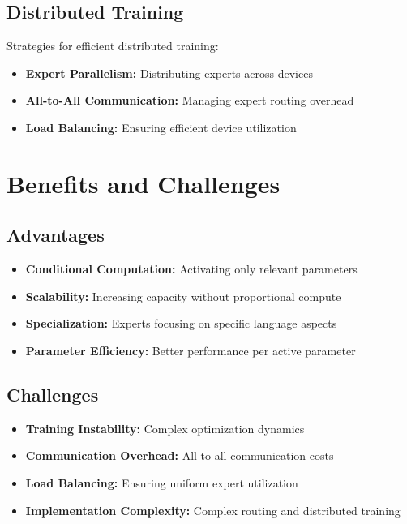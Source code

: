 \subsection{Distributed Training}
\noindent
Strategies for efficient distributed training:
\begin{itemize}
    \item \textbf{Expert Parallelism:} Distributing experts across devices
    \item \textbf{All-to-All Communication:} Managing expert routing overhead
    \item \textbf{Load Balancing:} Ensuring efficient device utilization
\end{itemize}

\section{Benefits and Challenges}
\label{sec:moe_benefits_challenges}

\subsection{Advantages}
\begin{itemize}
    \item \textbf{Conditional Computation:} Activating only relevant parameters
    \item \textbf{Scalability:} Increasing capacity without proportional compute
    \item \textbf{Specialization:} Experts focusing on specific language aspects
    \item \textbf{Parameter Efficiency:} Better performance per active parameter
\end{itemize}

\subsection{Challenges}
\begin{itemize}
    \item \textbf{Training Instability:} Complex optimization dynamics
    \item \textbf{Communication Overhead:} All-to-all communication costs
    \item \textbf{Load Balancing:} Ensuring uniform expert utilization
    \item \textbf{Implementation Complexity:} Complex routing and distributed training
\end{itemize}

